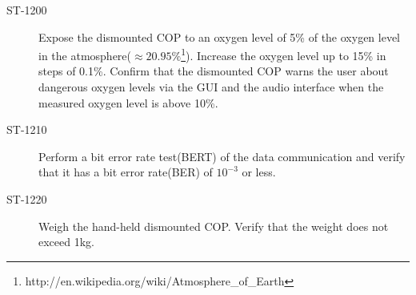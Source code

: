 \begin{description}
\item[ST-1200] Expose the dismounted COP to an oxygen level of 5\% of the oxygen level in the atmosphere($\approx 20.95\%$\footnote{http://en.wikipedia.org/wiki/Atmosphere\_of\_Earth}). Increase the oxygen level up to 15\% in steps of 0.1\%. Confirm that the dismounted COP warns the user about dangerous oxygen levels via the GUI and the audio interface when the measured oxygen level is above 10\%. 

\item[ST-1210] Perform a bit error rate test(BERT) of the data communication and verify that it has a bit error rate(BER) of $10^{-3}$ or less. 

\item[ST-1220] Weigh the hand-held dismounted COP. Verify that the weight does not exceed 1kg. 

\end{description}


